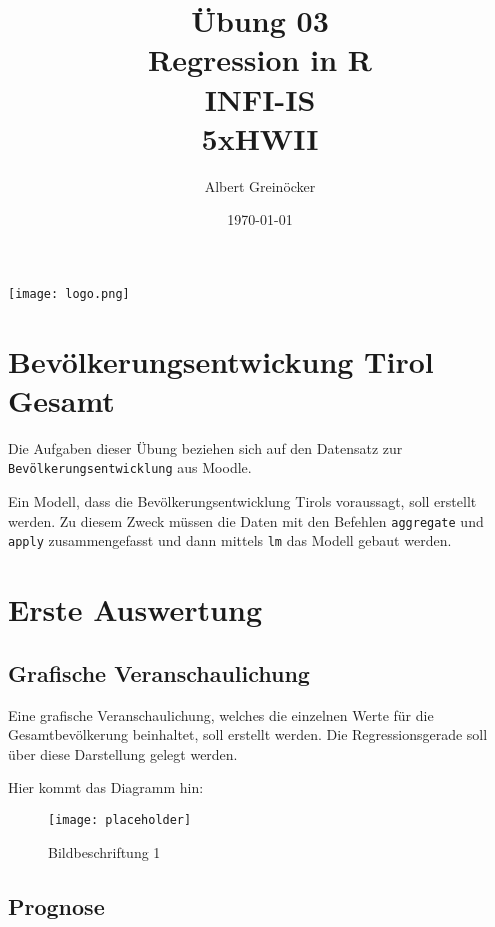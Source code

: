 \documentclass{article}
\title{Übung 03 \\ Regression in \textbf{R} \\ INFI-IS \\ 5xHWII}
\author{Albert Greinöcker}
\date{\today} %
\begin{document}
\maketitle %

\begin{center}

\texttt{[image: logo.png]}
\end{center}
\vspace{1cm}

\section{Bevölkerungsentwickung Tirol Gesamt}
\label{tirol_gesamt}

Die Aufgaben dieser Übung beziehen sich auf den Datensatz zur \texttt{Bevölkerungsentwicklung} aus Moodle.


Ein Modell, dass die Bevölkerungsentwicklung Tirols voraussagt, soll erstellt werden. Zu diesem Zweck müssen die Daten mit den Befehlen \texttt{aggregate} und \texttt{apply} zusammengefasst und dann mittels \texttt{lm} das Modell gebaut werden.


\section{Erste Auswertung}



\subsection{Grafische Veranschaulichung}

Eine grafische Veranschaulichung, welches die einzelnen Werte für die Gesamtbevölkerung beinhaltet, soll erstellt werden. Die Regressionsgerade soll über diese Darstellung gelegt werden.

Hier kommt das Diagramm hin:

\begin{figure}[H]
	\begin{center}
		\texttt{[image: placeholder]} %
		\caption{Bildbeschriftung 1}
	\end{center}
\end{figure}


\subsection{Prognose}
\end{document}
